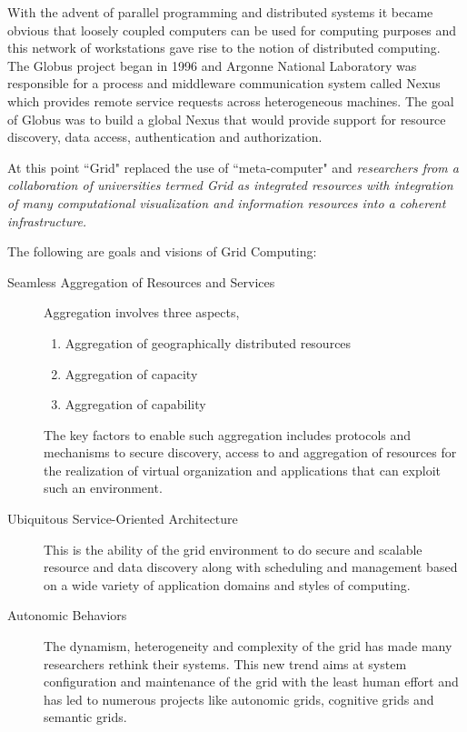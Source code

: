 \documentclass[ms,electronic,double]{nuthesis}
\begin{document}
 With the advent of parallel programming and distributed systems it became 
 obvious that loosely coupled computers can be used for computing purposes and this 
 network of workstations  gave rise to the notion of distributed computing. 
 The Globus project began in 1996 and Argonne National Laboratory was responsible for a process 
 and middleware communication system called Nexus which provides remote service 
 requests across heterogeneous machines. The goal of Globus was to build a 
 global Nexus that would provide support for resource discovery, data access, 
 authentication and authorization.

At this point ``Grid" replaced the use of ``meta-computer" and \emph{ researchers from 
a collaboration of universities termed Grid as integrated resources 
with integration of many computational visualization and information resources 
into a coherent infrastructure.}

The following are goals and visions of Grid Computing:


\begin{description}
  \item[Seamless Aggregation of Resources and Services]
  Aggregation involves three aspects, 
  \begin{enumerate}
    \item{Aggregation of geographically distributed resources}
    \item{Aggregation of capacity}
    \item{Aggregation of capability}
      \end{enumerate}
    The key factors to enable such aggregation includes protocols and mechanisms 
    to secure discovery, access to and aggregation of resources for the 
    realization of virtual organization and applications that can exploit such 
    an environment.

  \item[Ubiquitous Service-Oriented Architecture] This is the ability of the grid 
  environment to do secure and scalable resource and data discovery along with scheduling and 
  management based on a wide variety of application domains and styles of 
  computing.
  
  \item[Autonomic Behaviors]
  The dynamism, heterogeneity and complexity of the grid has made many 
  researchers rethink their systems. This new trend aims at system configuration 
  and maintenance of the grid with the least human effort and has led to numerous 
  projects like autonomic grids, cognitive grids and semantic grids.
  
\end{description}
\end{document}
